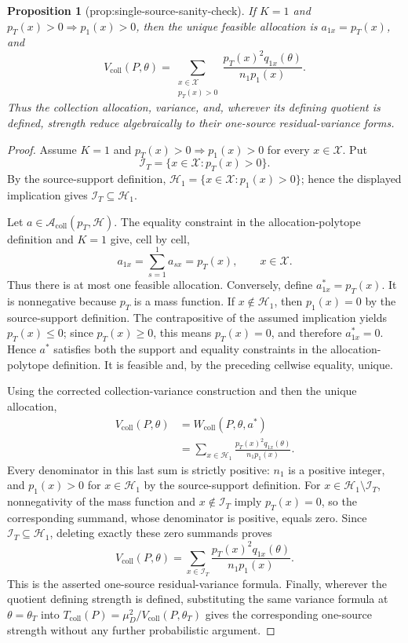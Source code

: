 \documentclass{article}
\newtheorem{proposition}{Proposition}
\begin{document}
\begin{proposition}[prop:single-source-sanity-check]\label{prop:single-source-sanity-check}
If \(K=1\) and \(p_T(x)>0\Rightarrow p_1(x)>0\), then the unique feasible allocation is \(a_{1x}=p_T(x)\), and
\[
V_{\mathrm{coll}}(P,\theta)
=\sum_{\substack{x\in\mathcal X\\ p_T(x)>0}}
\frac{p_T(x)^2q_{1x}(\theta)}{n_1p_1(x)}.
\]
Thus the collection allocation, variance, and, wherever its defining quotient is defined, strength reduce algebraically to their one-source residual-variance forms.
\end{proposition}
\begin{proof}
Assume \(K=1\) and \(p_T(x)>0\Rightarrow p_1(x)>0\) for every \(x\in\mathcal X\).  Put
\[
\mathcal I_T=\{x\in\mathcal X:p_T(x)>0\}.
\]
By the source-support definition, \(\mathcal H_1=\{x\in\mathcal X:p_1(x)>0\}\); hence the displayed implication gives \(\mathcal I_T\subseteq\mathcal H_1\).

Let \(a\in\mathcal A_{\mathrm{coll}}(p_T,\mathcal H)\).  The equality constraint in the allocation-polytope definition and \(K=1\) give, cell by cell,
\[
a_{1x}=\sum_{s=1}^{1}a_{sx}=p_T(x),\qquad x\in\mathcal X.
\]
Thus there is at most one feasible allocation.  Conversely, define \(a^*_{1x}=p_T(x)\).  It is nonnegative because \(p_T\) is a mass function.  If \(x\notin\mathcal H_1\), then \(p_1(x)=0\) by the source-support definition.  The contrapositive of the assumed implication yields \(p_T(x)\le 0\); since \(p_T(x)\ge0\), this means \(p_T(x)=0\), and therefore \(a^*_{1x}=0\).  Hence \(a^*\) satisfies both the support and equality constraints in the allocation-polytope definition.  It is feasible and, by the preceding cellwise equality, unique.

Using the corrected collection-variance construction and then the unique allocation,
\[
\begin{aligned}
V_{\mathrm{coll}}(P,\theta)
&=W_{\mathrm{coll}}(P,\theta,a^*)\\
&=\sum_{x\in\mathcal H_1}
  \frac{p_T(x)^2q_{1x}(\theta)}{n_1p_1(x)}.
\end{aligned}
\]
Every denominator in this last sum is strictly positive: \(n_1\) is a positive integer, and \(p_1(x)>0\) for \(x\in\mathcal H_1\) by the source-support definition.  For \(x\in\mathcal H_1\setminus\mathcal I_T\), nonnegativity of the mass function and \(x\notin\mathcal I_T\) imply \(p_T(x)=0\), so the corresponding summand, whose denominator is positive, equals zero.  Since \(\mathcal I_T\subseteq\mathcal H_1\), deleting exactly these zero summands proves
\[
V_{\mathrm{coll}}(P,\theta)
=\sum_{x\in\mathcal I_T}
  \frac{p_T(x)^2q_{1x}(\theta)}{n_1p_1(x)}.
\]
This is the asserted one-source residual-variance formula.  Finally, wherever the quotient defining strength is defined, substituting the same variance formula at \(\theta=\theta_T\) into \(T_{\mathrm{coll}}(P)=\mu_D^2/V_{\mathrm{coll}}(P,\theta_T)\) gives the corresponding one-source strength without any further probabilistic argument.
\end{proof}
\end{document}
